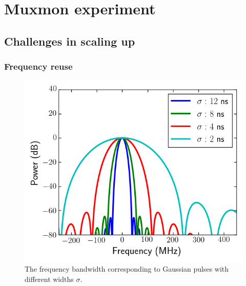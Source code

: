 

\part{Muxmon experiment}

  \chapter{Challenges in scaling up}
    \label{ch:Challenges in scaling up}

    \section{Frequency reuse}
      \label{sec:frequency reuse}

      \begin{figure}
        \begin{center}
        \vspace{-30pt}
          \includegraphics[width=\textwidth]{Figures/Exploring frequency reuse/bandwidth_broadening.png}
        \end{center}
        \caption{The frequency bandwidth corresponding to Gaussian pulses with different widths $\sigma$.}
        \label{fig:bandwidth broadening}
        \vspace{-20pt}
      \end{figure}

